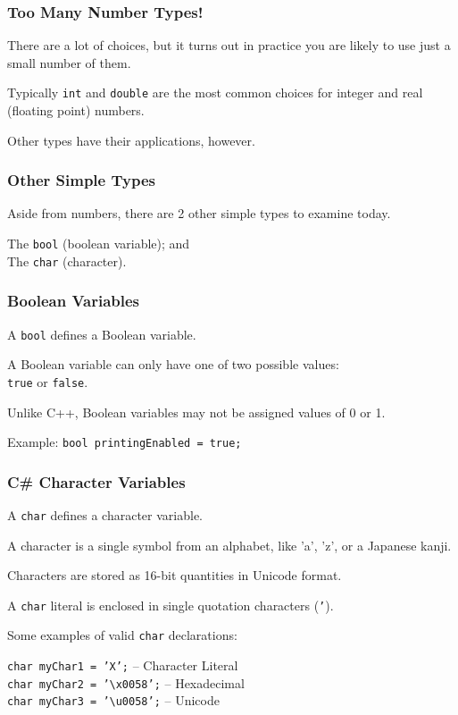 \begin{frame}
\frametitle{Too Many Number Types!}

There are a lot of choices, but it turns out in practice you are likely to use just a small number of them.

Typically \texttt{int} and \texttt{double} are the most common choices for integer and real (floating point) numbers.

Other types have their applications, however.

\end{frame}

\begin{frame}
\frametitle{Other Simple Types}

Aside from numbers, there are 2 other simple types to examine today.

The \texttt{bool} (boolean variable); and \\
The \texttt{char} (character).

\end{frame}

\begin{frame}
\frametitle{Boolean Variables}

A \texttt{bool} defines a Boolean variable.

A Boolean variable can only have one of two possible values: \\
\quad \texttt{true} or \texttt{false}.

Unlike C++, Boolean variables may not be assigned values of 0 or 1.

Example: \texttt{bool printingEnabled = true;}

\end{frame}

\begin{frame}
\frametitle{C\# Character Variables}

A \texttt{char} defines a character variable.

A character is a single symbol from an alphabet, like 'a', 'z', or a Japanese kanji.

Characters are stored as 16-bit quantities in Unicode format.

A \texttt{char} literal is enclosed in single quotation characters (\texttt{'}).

Some examples of valid \texttt{char} declarations:

\texttt{char myChar1 = 'X';}  -- Character Literal\\
\texttt{char myChar2 = '\textbackslash x0058';} -- Hexadecimal\\
\texttt{char myChar3 = '\textbackslash u0058';} -- Unicode

\end{frame}

